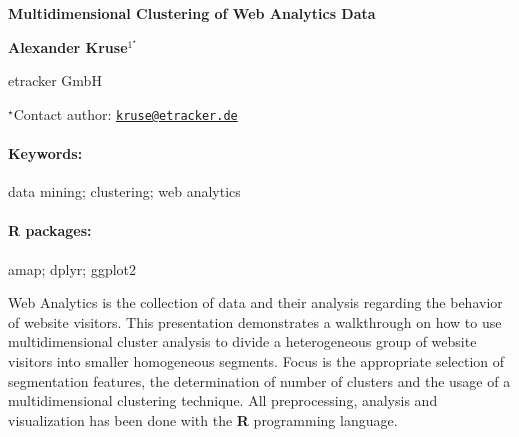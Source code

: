 \documentclass[11pt, a4paper]{article}
\renewcommand{\title}[1]{\begin{center}{\bf \LARGE #1}\end{center}}
\newcommand{\keywords}{\paragraph{Keywords:}}
\newcommand{\packages}{\paragraph{R packages:}}
\begin{document}
\pagestyle{empty}

\title{Multidimensional Clustering of Web Analytics Data}

\begin{center}
  {\bf Alexander Kruse$^{1^\star}$}
\end{center}

\vskip 0.3cm

\begin{affiliations}
\begin{enumerate}
\begin{minipage}{0.915\textwidth}
\centering
\item etracker GmbH \\[-2pt]
\end{minipage}
\end{enumerate}
$^\star$Contact author: \href{mailto:kruse@etracker.de}{\nolinkurl{kruse@etracker.de}}\\
\end{affiliations}

\vskip 0.5cm

\begin{minipage}{0.915\textwidth}
\keywords data mining; clustering; web analytics
\packages amap; dplyr; ggplot2
\end{minipage}

\vskip 0.8cm

Web Analytics is the collection of data and their analysis regarding the
behavior of website visitors. This presentation demonstrates a
walkthrough on how to use multidimensional cluster analysis to divide a
heterogeneous group of website visitors into smaller homogeneous
segments. Focus is the appropriate selection of segmentation features,
the determination of number of clusters and the usage of a
multidimensional clustering technique. All preprocessing, analysis and
visualization has been done with the \textbf{R} programming language.
\end{document}

